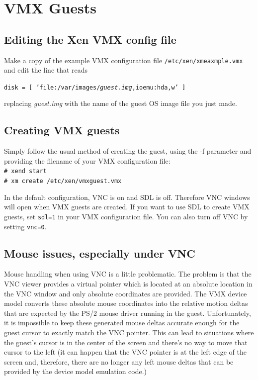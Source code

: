 \documentclass[11pt,twoside,final,openright]{report}
\begin{document}
\section{VMX Guests}
\subsection{Editing the Xen VMX config file}
Make a copy of the example VMX configuration file {\small {\tt /etc/xen/xmeaxmple.vmx}} and edit the line that reads

{\small {\tt disk = [ 'file:/var/images/\emph{guest.img},ioemu:hda,w' ]}}

replacing \emph{guest.img} with the name of the guest OS image file you just made.

\subsection{Creating VMX guests}
Simply follow the usual method of creating the guest, using the -f parameter and providing the filename of your VMX configuration file:\\

{\small {\tt \# xend start\\
\# xm create /etc/xen/vmxguest.vmx}}

In the default configuration, VNC is on and SDL is off. Therefore VNC windows will open when VMX guests are created. If you want to use SDL to create VMX guests, set {\small {\tt sdl=1}} in your VMX configuration file. You can also turn off VNC by setting {\small {\tt vnc=0}}.
 
\subsection{Mouse issues, especially under VNC}
Mouse handling when using VNC is a little problematic.
The problem is that the VNC viewer provides a virtual pointer which is
located at an absolute location in the VNC window and only absolute
coordinates are provided.
The VMX device model converts these absolute mouse coordinates
into the relative motion deltas that are expected by the PS/2
mouse driver running in the guest.
Unfortunately,
it is impossible to keep these generated mouse deltas
accurate enough for the guest cursor to exactly match
the VNC pointer.
This can lead to situations where the guest's cursor
is in the center of the screen and there's no way to
move that cursor to the left
(it can happen that the VNC pointer is at the left
edge of the screen and,
therefore,
there are no longer any left mouse deltas that
can be provided by the device model emulation code.)
\end{document}
